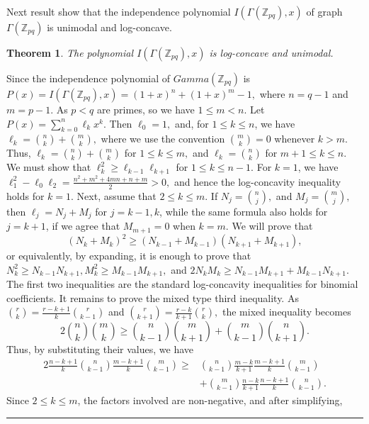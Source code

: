 \documentclass[12pt,twoside]{article}
\newtheorem{theorem}{Theorem}[section]
\renewenvironment{proof}{{\noindent\bfseries Proof.}}{\qed}
\def\qed{\nolinebreak\hfill\rule{.2cm}{.2cm}\par\addvspace{.5cm}}
\begin{document}
Next result show that the independence polynomial $I(\varGamma(\mathbb{Z}_{pq}), x) $ of graph $ \varGamma(\mathbb{Z}_{pq})$
 is unimodal and log-concave. 
 \begin{theorem}
 	The polynomial $I(\varGamma(\mathbb{Z}_{pq}),x)$ is log-concave and unimodal.
 \end{theorem}
 
 \begin{proof}
 	Since the independence polynomial of $Gamma(\mathbb{Z}_{pq})$ is 
 	$
 	P(x)=I(\varGamma(\mathbb{Z}_{pq}),x)=(1+x)^n+(1+x)^m-1,
 	$
 	where $n=q-1$ and $m=p-1$. As $p<q$ are primes, so we have $1\leq m<n$. Let
 	$
 	P(x)=\sum_{k=0}^{n}\ell_kx^k.
 	$
 	Then
 	$
 	\ell_0=1,
 	$
 	and, for $1\leq k\leq n$, we have 
 	$
 	\ell_k=\binom{n}{k}+\binom{m}{k},
 	$
 	where we use the convention $\binom{m}{k}=0$ whenever $k>m$. Thus, 
 	$
 	\ell_k=
 	\binom{n}{k}+\binom{m}{k}$ for $1\leq k\leq m,$
 	and
 	$\ell_k=\binom{n}{k}$ for $m+1\leq k\leq n.$
 	We must show that
 	$
 	\ell_k^2\geq \ell_{k-1}\ell_{k+1}$ for $1\leq k\leq n-1.$
 	For  $k=1$,  we have 
 	$
 	\ell_1^2-\ell_0\ell_2
 	=
 	\tfrac{n^2+m^2+4mn+n+m}{2}>0,
 	$ and hence the log-concavity inequality holds for $k=1$.
 	 Next, assume that $2\leq k\leq m$. If 
 	$
 	N_j=\binom{n}{j},$ and $ M_j=\binom{m}{j},
 	$
 	then
 	$
 	\ell_j=N_j+M_j
 	$
 	for $j=k-1,k$, while the same formula also holds for $j=k+1$, if we agree that $M_{m+1}=0$ when $k=m$. We will prove that
 	$$
 	(N_k+M_k)^2\geq (N_{k-1}+M_{k-1})(N_{k+1}+M_{k+1}), 
 	$$
 	or equivalently, by expanding, it is enough to prove that 
 	$
 	N_k^2\geq N_{k-1}N_{k+1}, 
 	M_k^2\geq M_{k-1}M_{k+1},
 	$
 	and
 	$
 	2N_kM_k\geq N_{k-1}M_{k+1}+M_{k-1}N_{k+1}.
 	$
 	The first two inequalities are the standard log-concavity inequalities for binomial coefficients. It remains to prove the mixed type  third inequality.  As
 	$
 	\binom{r}{k}
 	=
 	\frac{r-k+1}{k}\binom{r}{k-1}
 	$
 	and
 	$
 	\binom{r}{k+1}
 	=
 	\frac{r-k}{k+1}\binom{r}{k},
 	$
 	the mixed inequality becomes
 	$$
 	2\binom{n}{k}\binom{m}{k}
 	\geq
 	\binom{n}{k-1}\binom{m}{k+1}
 	+
 	\binom{m}{k-1}\binom{n}{k+1}.
 	$$
 	Thus, by substituting their values, we have
 	\begin{align*}
 		2\frac{n-k+1}{k}\binom{n}{k-1}
 		\frac{m-k+1}{k}\binom{m}{k-1}\geq&
 		\binom{n}{k-1}
 		\frac{m-k}{k+1}
 		\frac{m-k+1}{k}
 		\binom{m}{k-1} \\ & +
 		\binom{m}{k-1}
 		\frac{n-k}{k+1}
 		\frac{n-k+1}{k}
 		\binom{n}{k-1}.
 	\end{align*}
 	Since $2\leq k\leq m$, the factors involved are non-negative, and after simplifying, 

\end{proof}
\end{document}
